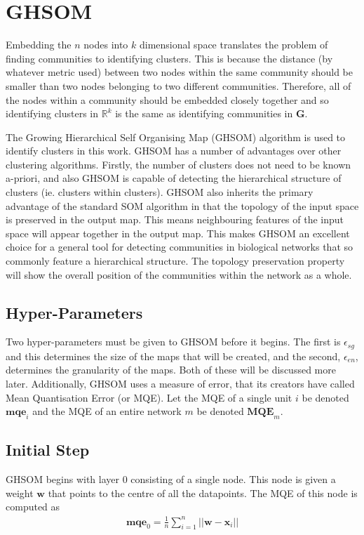 \documentclass{report}
\begin{document}
\section{GHSOM}
Embedding the $n$ nodes into $k$ dimensional space translates the problem of finding communities to identifying clusters. This is because the distance (by whatever metric used) between two nodes within the same community should be smaller than two nodes belonging to two different communities. Therefore, all of the nodes within a community should be embedded closely together and so identifying clusters in $\mathbb{R}^k$ is the same as identifying communities in $\textbf{G}$.

The Growing Hierarchical Self Organising Map (GHSOM) algorithm is used to identify clusters in this work. GHSOM has a number of advantages over other clustering algorithms. Firstly, the number of clusters does not need to be known a-priori, and also GHSOM is capable of detecting the hierarchical structure of clusters (ie. clusters within clusters). GHSOM also inherits the primary advantage of the standard SOM algorithm in that the topology of the input space is preserved in the output map. This means neighbouring features of the input space will appear together in the output map. This makes GHSOM an excellent choice for a general tool for detecting communities in biological networks that so commonly feature a hierarchical structure. The topology preservation property will show the overall position of the communities within the network as a whole. 


\subsection{Hyper-Parameters}
Two hyper-parameters must be given to GHSOM before it begins. The first is $\epsilon_{sg}$ and this determines the size of the maps that will be created, and the second, $\epsilon_{en}$, determines the granularity of the maps. Both of these will be discussed more later. Additionally, GHSOM uses a measure of error, that its creators have called Mean Quantisation Error (or MQE). Let the MQE of a single unit $i$ be denoted $\textbf{mqe}_i$ and the MQE of an entire network $m$ be denoted $\textbf{MQE}_m$.

\subsection{Initial Step}
GHSOM begins with layer 0 consisting of a single node. This node is given a weight $\textbf{w}$ that points to the centre of all the datapoints. The MQE of this node is computed as 
\begin{align*}
\textbf{mqe}_0 = \frac{1}{n} \sum_{i=1}^n ||\textbf{w} - \textbf{x}_i||
\end{align*} 
\end{document}

